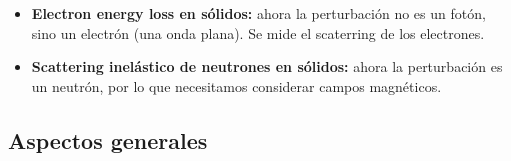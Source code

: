 \begin{itemize}
    \item \textbf{Electron energy loss en sólidos:} ahora la perturbación no es un fotón, sino un electrón (una onda plana). Se mide el scaterring de los electrones.
      \begin{figure}[H]
          \centering
      \end{figure}
    \item \textbf{Scattering inelástico de neutrones en sólidos:} ahora la perturbación es un neutrón, por lo que necesitamos considerar campos magnéticos.
      \begin{figure}[H]
          \centering
      \end{figure}
  \end{itemize}

\subsection{Aspectos generales}

